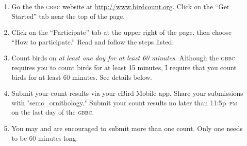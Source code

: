 \documentclass[11pt]{article}
\begin{document}
\begin{enumerate}
	\item Go the the \textsc{gbbc} website at \url{http://www.birdcount.org}. Click on the “Get Started” tab near the top of the page.

	\item Click on the “Participate” tab at the upper right of the page, then choose “How to participate.” Read and follow the steps listed.
	
	  
	
	
	
	\item Count birds on \emph{at least one day for at least 60 minutes.} Although the \textsc{gbbc} requires you to count birds for at least 15 minutes, I require that you count birds for at least 60 minutes. See details below.

	\item Submit your count results via your eBird Mobile app. Share your submissions with "semo\_ornithology." Submit your count results no later than 11:5p~\textsc{pm} on the last day of the \textsc{gbbc}.
	
	
	\item You may and are encouraged to submit more than one count. Only one needs to be 60 minutes long.
    
\end{enumerate}
\end{document}
